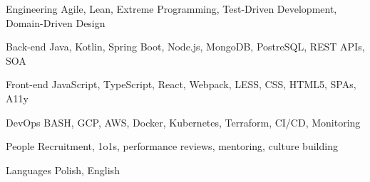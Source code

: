 

\begin{cvskills}

  \cvskill
  {Engineering} %
  {Agile, Lean, Extreme Programming, Test-Driven Development, Domain-Driven Design} %

  \cvskill
    {Back-end} %
    {Java, Kotlin, Spring Boot, Node.js, MongoDB, PostreSQL, REST APIs, SOA} %

  \cvskill
    {Front-end} %
    {JavaScript, TypeScript, React, Webpack, LESS, CSS, HTML5, SPAs, A11y} %

  \cvskill
  {DevOps} %
  {BASH, GCP, AWS, Docker, Kubernetes, Terraform, CI/CD, Monitoring} %

  \cvskill
    {People} %
    {Recruitment, 1o1s, performance reviews, mentoring, culture building} %

  \cvskill
    {Languages} %
    {Polish, English} %

\end{cvskills}
